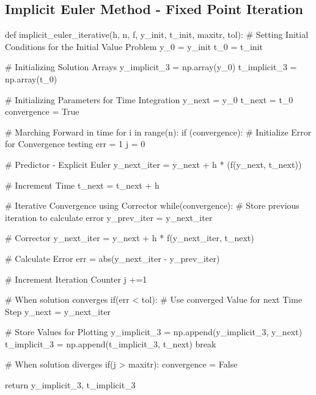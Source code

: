 \subsection{Implicit Euler Method - Fixed Point Iteration}
\begin{python}
def implicit_euler_iterative(h, n, f, y_init, t_init, maxitr, tol):
	# Setting Initial Conditions for the Initial Value Problem
    y_0 = y_init
    t_0 = t_init
    
    # Initializing Solution Arrays
    y_implicit_3 = np.array(y_0)
    t_implicit_3 = np.array(t_0)

    # Initializing Parameters for Time Integration
    y_next = y_0
    t_next = t_0
    convergence = True

    # Marching Forward in time
    for i in range(n):
        if (convergence):
            # Initialize Error for Convergence testing
            err = 1
            j = 0

            # Predictor - Explicit Euler
            y_next_iter = y_next + h * (f(y_next, t_next))

            # Increment Time
            t_next = t_next + h

            # Iterative Convergence using Corrector
            while(convergence):
                # Store previous iteration to calculate error
                y_prev_iter = y_next_iter

                # Corrector 
                y_next_iter = y_next + h * f(y_next_iter, t_next)


                # Calculate Error
                err = abs(y_next_iter - y_prev_iter)
                
                # Increment Iteration Counter
                j +=1

                # When solution converges 
                if(err < tol):
                    # Use converged Value for next Time Step
                    y_next = y_next_iter

                    # Store Values for Plotting
                    y_implicit_3 = np.append(y_implicit_3, y_next)
                    t_implicit_3 = np.append(t_implicit_3, t_next)
                    break

                # When solution diverges
                if(j > maxitr):
                    convergence = False
                   
    return y_implicit_3, t_implicit_3
\end{python}
\pagebreak[4]